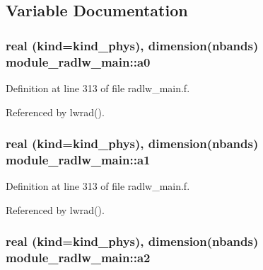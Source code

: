 \subsection{Variable Documentation}
\subsubsection[{\texorpdfstring{a0}{a0}}]{\setlength{\rightskip}{0pt plus 5cm}real (kind=kind\+\_\+phys), dimension(nbands) module\+\_\+radlw\+\_\+main\+::a0\hspace{0.3cm}{\ttfamily [private]}}\hypertarget{group__module__radlw__main_gae55000724e738b7a5b7be4c8cef07553}{}\label{group__module__radlw__main_gae55000724e738b7a5b7be4c8cef07553}


Definition at line 313 of file radlw\+\_\+main.\+f.



Referenced by lwrad().

\subsubsection[{\texorpdfstring{a1}{a1}}]{\setlength{\rightskip}{0pt plus 5cm}real (kind=kind\+\_\+phys), dimension(nbands) module\+\_\+radlw\+\_\+main\+::a1\hspace{0.3cm}{\ttfamily [private]}}\hypertarget{group__module__radlw__main_gaeba888f00b19a65460f3b587c60ea4a0}{}\label{group__module__radlw__main_gaeba888f00b19a65460f3b587c60ea4a0}


Definition at line 313 of file radlw\+\_\+main.\+f.



Referenced by lwrad().

\subsubsection[{\texorpdfstring{a2}{a2}}]{\setlength{\rightskip}{0pt plus 5cm}real (kind=kind\+\_\+phys), dimension(nbands) module\+\_\+radlw\+\_\+main\+::a2\hspace{0.3cm}{\ttfamily [private]}}\hypertarget{group__module__radlw__main_ga1b4681c9bcc9434e30fef0ca4aaa9dcd}{}\label{group__module__radlw__main_ga1b4681c9bcc9434e30fef0ca4aaa9dcd}


